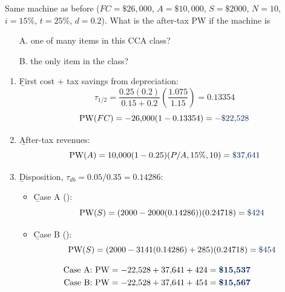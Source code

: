 \begin{example}
    Same machine as before ($FC = \$26{,}000$, $A = \$10{,}000$,
    $S = \$2000$, $N = 10$, $i = 15\%$, $t = 25\%$, $d = 0.2$). What is the
    after-tax PW if the machine is
    \begin{itemize}
        \item[A.] one of many items in this CCA class?
        \item[B.] the only item in the class?
    \end{itemize}
    \begin{enumerate}[label = \arabic*.]
        \item \b{First cost + tax savings from depreciation}:
        \[\tau_{1/2} = \frac{0.25(0.2)}{0.15 + 0.2}\left(\frac{1.075}{1.15}\right) = 0.13354\]
        \[\text{PW}(FC) = -26{,}000(1 - 0.13354) = \db{-\$22{,}528}\]
        \item \b{After-tax revenues}: 
        \[\text{PW}(A) = 10{,}000(1 - 0.25)(P/A,15\%,10) = \db{\$37{,}641}\]
        \item \b{Disposition}, $\tau_{db} = 0.05/0.35 = 0.14286$:
        \begin{itemize}
            \item \b{Case A} (): 
            \[\text{PW}(S) = (2000 - 2000(0.14286))(0.24718) = \db{\$424}\]
            \item \b{Case B} (): 
            \[\text{PW}(S) = (2000 - 3141(0.14286) + 285)(0.24718) = \db{\$454}\]
        \end{itemize}
    \end{enumerate}
    \begin{align*}
        \text{Case A: } \text{PW} &= -22{,}528 + 37{,}641 + 424 = \dbb{\$15{,}537}\\
        \text{Case B: } \text{PW} &= -22{,}528 + 37{,}641 + 454 = \dbb{\$15{,}567}
    \end{align*}
\end{example}

